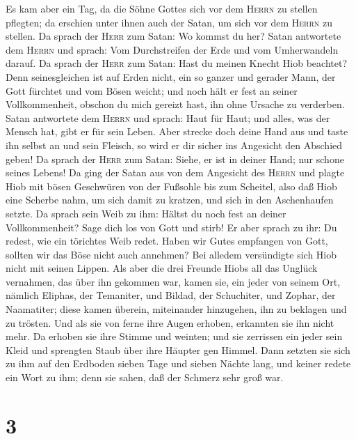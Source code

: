 Es kam aber ein Tag, da die Söhne Gottes sich vor dem
\textsc{Herrn} zu stellen pflegten; da erschien unter ihnen auch der
Satan, um sich vor dem \textsc{Herrn} zu stellen.  Da
sprach der \textsc{Herr} zum Satan: Wo kommst du her? Satan antwortete
dem \textsc{Herrn} und sprach: Vom Durchstreifen der Erde und vom
Umherwandeln darauf.  Da sprach der \textsc{Herr} zum
Satan: Hast du meinen Knecht Hiob beachtet? Denn seinesgleichen ist auf
Erden nicht, ein so ganzer und gerader Mann, der Gott fürchtet und vom
Bösen weicht; und noch hält er fest an seiner Vollkommenheit, obschon du
mich gereizt hast, ihn ohne Ursache zu verderben.  Satan
antwortete dem \textsc{Herrn} und sprach: Haut für Haut; und alles, was
der Mensch hat, gibt er für sein Leben.  Aber strecke doch
deine Hand aus und taste ihn selbst an und sein Fleisch, so wird er dir
sicher ins Angesicht den Abschied geben!  Da sprach der
\textsc{Herr} zum Satan: Siehe, er ist in deiner Hand; nur schone seines
Lebens!  Da ging der Satan aus von dem Angesicht des
\textsc{Herrn} und plagte Hiob mit bösen Geschwüren von der Fußsohle bis
zum Scheitel,  also daß Hiob eine Scherbe nahm, um sich
damit zu kratzen, und sich in den Aschenhaufen setzte.  Da
sprach sein Weib zu ihm: Hältst du noch fest an deiner Vollkommenheit?
Sage dich los von Gott und stirb!  Er aber sprach zu ihr:
Du redest, wie ein törichtes Weib redet. Haben wir Gutes empfangen von
Gott, sollten wir das Böse nicht auch annehmen? Bei alledem versündigte
sich Hiob nicht mit seinen Lippen.  Als aber die drei
Freunde Hiobs all das Unglück vernahmen, das über ihn gekommen war,
kamen sie, ein jeder von seinem Ort, nämlich Eliphas, der Temaniter, und
Bildad, der Schuchiter, und Zophar, der Naamatiter; diese kamen überein,
miteinander hinzugehen, ihn zu beklagen und zu trösten. 
Und als sie von ferne ihre Augen erhoben, erkannten sie ihn nicht mehr.
Da erhoben sie ihre Stimme und weinten; und sie zerrissen ein jeder sein
Kleid und sprengten Staub über ihre Häupter gen Himmel. 
Dann setzten sie sich zu ihm auf den Erdboden sieben Tage und sieben
Nächte lang, und keiner redete ein Wort zu ihm; denn sie sahen, daß der
Schmerz sehr groß war.

\hypertarget{section-2}{%
\section{3}\label{section-2}}

